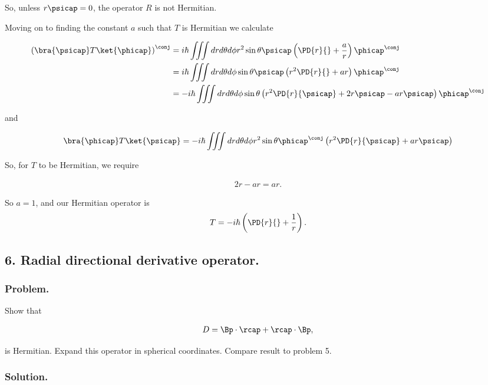 So, unless $r\psicap = 0$, the operator $R$ is not Hermitian.

Moving on to finding the constant $a$ such that $T$ is Hermitian we calculate

\begin{align*}
\left( \bra{\psicap} T \ket{\phicap} \right)^\conj
&= i \hbar \iiint dr d\theta d\phi r^2 \sin\theta \psicap \left( \PD{r}{} + \frac{a}{r} \right) \phicap^\conj \\
&= i \hbar \iiint dr d\theta d\phi \sin\theta \psicap \left( r^2 \PD{r}{} + a r \right) \phicap^\conj \\
&= -i \hbar \iiint dr d\theta d\phi \sin\theta \left( r^2 \PD{r}{\psicap} + 2 r \psicap - a r \psicap \right) \phicap^\conj \\
\end{align*}

and

\begin{align*}
\bra{\phicap} T \ket{\psicap} 
= -i \hbar \iiint dr d\theta d\phi r^2 \sin\theta \phicap^\conj \left( r^2 \PD{r}{\psicap} + a r \psicap \right)
\end{align*}

So, for $T$ to be Hermitian, we require

\begin{align*}
2 r - a r = a r.
\end{align*}

So $a = 1$, and our Hermitian operator is
\begin{align*}
T = -i \hbar \left( \PD{r}{} + \frac{1}{r} \right).
\end{align*}

\subsection{6. Radial directional derivative operator.}

\subsubsection{Problem.}
Show that 

\begin{align*}
D = \Bp \cdot \rcap + \rcap \cdot \Bp,
\end{align*}

is Hermitian.  Expand this operator in spherical coordinates.  Compare result to problem 5.

\subsubsection{Solution.}

